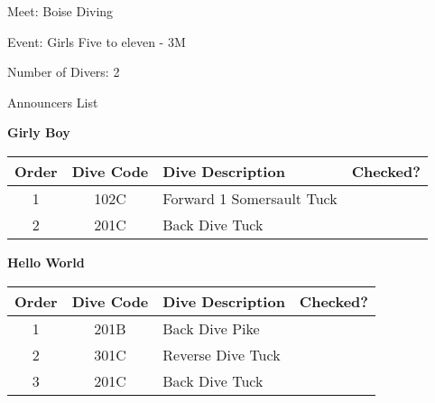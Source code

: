 \documentclass[12pt, letterpaper, portrait]{article}
\begin{document}
    Meet: Boise Diving
    
    Event: Girls Five to eleven - 3M

	Number of Divers: 2
	
	\begin{center}
		Announcers List
    \end{center}

    \textbf{Girly Boy}

\begin{table}[h]
		\centering
			\begin{tabularx}{\textwidth}{c c X X}
            Order&Dive Code&Dive Description&Checked?\\\midrule
            1&102C&Forward 1 Somersault Tuck&\underline{\hspace{1cm}}\\
2&201C&Back Dive Tuck&\underline{\hspace{1cm}}\\

		\end{tabularx}
	\end{table}

    \vspace{2cm}\textbf{Hello World}

\begin{table}[h]
		\centering
			\begin{tabularx}{\textwidth}{c c X X}
            Order&Dive Code&Dive Description&Checked?\\\midrule
            1&201B&Back Dive Pike&\underline{\hspace{1cm}}\\
2&301C&Reverse Dive Tuck&\underline{\hspace{1cm}}\\
3&201C&Back Dive Tuck&\underline{\hspace{1cm}}\\

		\end{tabularx}
	\end{table}

    \vspace{2cm}
\end{document}
